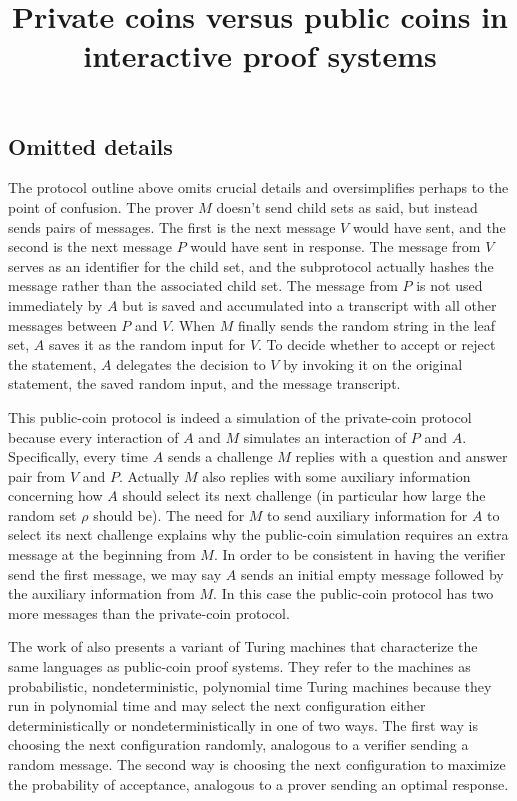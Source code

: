 \subsection{Omitted details}

The protocol outline above omits crucial details and oversimplifies perhaps to the point of confusion.
The prover $M$ doesn't send child sets as said, but instead sends pairs of messages.
The first is the next message $V$ would have sent, and the second is the next message $P$ would have sent in response.
The message from $V$ serves as an identifier for the child set, and the subprotocol actually hashes the message rather than the associated child set.
The message from $P$ is not used immediately by $A$ but is saved and accumulated into a transcript with all other messages between $P$ and $V$.
When $M$ finally sends the random string in the leaf set, $A$ saves it as the random input for $V$.
To decide whether to accept or reject the statement, $A$ delegates the decision to $V$ by invoking it on the original statement, the saved random input, and the message transcript.

This public-coin protocol is indeed a simulation of the private-coin protocol because every interaction of $A$ and $M$ simulates an interaction of $P$ and $A$.
Specifically, every time $A$ sends a challenge $M$ replies with a question and answer pair from $V$ and $P$.
Actually $M$ also replies with some auxiliary information concerning how $A$ should select its next challenge (in particular how large the random set $\rho$ should be).
The need for $M$ to send auxiliary information for $A$ to select its next challenge explains why the public-coin simulation requires an extra message at the beginning from $M$.
In order to be consistent in having the verifier send the first message, we may say $A$ sends an initial empty message followed by the auxiliary information from $M$.
In this case the public-coin protocol has two more messages than the private-coin protocol.


The work of \cite{GS86} also presents a variant of Turing machines that characterize the same languages as public-coin proof systems.
They refer to the machines as probabilistic, nondeterministic, polynomial time Turing machines because they run in polynomial time and may select the next configuration either deterministically or nondeterministically in one of two ways.
The first way is choosing the next configuration randomly, analogous to a verifier sending a random message.
The second way is choosing the next configuration to maximize the probability of acceptance, analogous to a prover sending an optimal response.

\begin{references}
    \title{Private coins versus public coins in interactive proof systems}

\end{references}